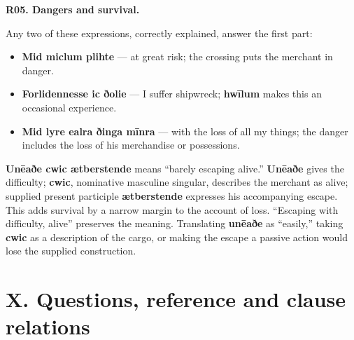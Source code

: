 \par\begin{minipage}{\linewidth}\raggedright
\textbf{R05. Dangers and survival.}

Any two of these expressions, correctly explained, answer the first part:

\begin{itemize}
\item \textbf{Mid miclum plihte} — at great risk; the crossing puts the merchant in danger.
\item \textbf{Forlidennesse ic ðolie} — I suffer shipwreck; \textbf{hwīlum} makes this an occasional experience.
\item \textbf{Mid lyre ealra ðinga mīnra} — with the loss of all my things; the danger includes the loss of his merchandise or possessions.
\end{itemize}

\textbf{Unēaðe cwic ætberstende} means “barely escaping alive.” \textbf{Unēaðe} gives the difficulty; \textbf{cwic}, nominative masculine singular, describes the merchant as alive; supplied present participle \textbf{ætberstende} expresses his accompanying escape. This adds survival by a narrow margin to the account of loss. “Escaping with difficulty, alive” preserves the meaning. Translating \textbf{unēaðe} as “easily,” taking \textbf{cwic} as a description of the cargo, or making the escape a passive action would lose the supplied construction.

\end{minipage}\par\addvspace{4pt}

\section*{X. Questions, reference and clause relations}

